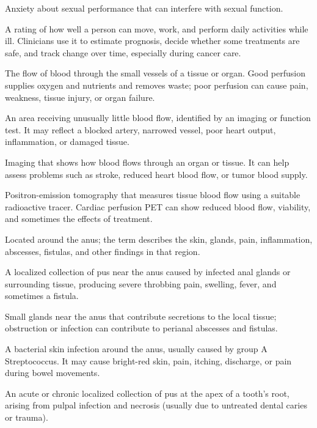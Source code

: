  Anxiety about sexual performance that can interfere with sexual function.

 A rating of how well a person can move, work, and perform daily activities while ill. Clinicians use it to estimate prognosis, decide whether some treatments are safe, and track change over time, especially during cancer care.

 The flow of blood through the small vessels of a tissue or organ. Good perfusion supplies oxygen and nutrients and removes waste; poor perfusion can cause pain, weakness, tissue injury, or organ failure.

 An area receiving unusually little blood flow, identified by an imaging or function test. It may reflect a blocked artery, narrowed vessel, poor heart output, inflammation, or damaged tissue.

 Imaging that shows how blood flows through an organ or tissue. It can help assess problems such as stroke, reduced heart blood flow, or tumor blood supply.

 Positron-emission tomography that measures tissue blood flow using a suitable radioactive tracer. Cardiac perfusion PET can show reduced blood flow, viability, and sometimes the effects of treatment.

 Located around the anus; the term describes the skin, glands, pain, inflammation, abscesses, fistulas, and other findings in that region.

 A localized collection of pus near the anus caused by infected anal glands or surrounding tissue, producing severe throbbing pain, swelling, fever, and sometimes a fistula.

 Small glands near the anus that contribute secretions to the local tissue; obstruction or infection can contribute to perianal abscesses and fistulas.

 A bacterial skin infection around the anus, usually caused by group A Streptococcus. It may cause bright-red skin, pain, itching, discharge, or pain during bowel movements.

 An acute or chronic localized collection of pus at the apex of a tooth's root, arising
from pulpal infection and necrosis (usually due to untreated dental caries or trauma).

